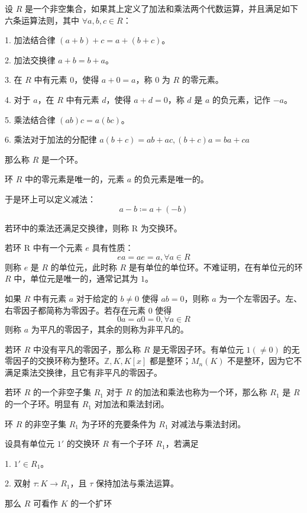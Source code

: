 \begin{definition}[环]
	设 $R$ 是一个非空集合，如果其上定义了加法和乘法两个代数运算，并且满足如下六条运算法则，其中 $\forall a,b,c\in R$：
	
	1. 加法结合律 $(a+b)+c = a+(b+c)$。
	
	2. 加法交换律 $a+b = b+a$。
	
	3. 在 $R$ 中有元素 $0$，使得 $a+0=a$，称 $0$ 为 $R$ 的零元素。
	
	4. 对于 $a$，在 $R$ 中有元素 $d$，使得 $a+d=0$，称 $d$ 是 $a$ 的负元素，记作 $-a$。
	
	5. 乘法结合律 $(ab)c = a(bc)$。
	
	6. 乘法对于加法的分配律 $a(b+c) = ab+ac,(b+c)a = ba+ca$
	
	那么称 $R$ 是一个环。
\end{definition}

\begin{theorem}
	环 $R$ 中的零元素是唯一的，元素 $a$ 的负元素是唯一的。
\end{theorem}

于是环上可以定义减法：
\[a-b \coloneqq  a + (-b)\]

若环中的乘法还满足交换律，则称 R 为交换环。

若环 R 中有一个元素 $e$ 具有性质：
\[ea = ae  = a, \forall a \in R\]
则称 $e$ 是 $R$ 的单位元，此时称 $R$ 是有单位的单位环。不难证明，在有单位元的环 $R$ 中，单位元是唯一的，通常记其为 $1$。

如果 $R$ 中有元素 $a$ 对于给定的 $b \ne 0$ 使得 $ab=0$，则称 $a$ 为一个左零因子。左、右零因子都简称为零因子。若存在元素 $0$ 使得
\[0a=a0=0, \forall a \in R\]
则称 $a$ 为平凡的零因子，其余的则称为非平凡的。

若环 $R$ 中没有平凡的零因子，那么称 $R$ 是无零因子环。有单位元 $1(\ne 0)$ 的无零因子的交换环称为整环。$\mathbb{Z},K,K[x]$ 都是整环；$M_n(K)$ 不是整环，因为它不满足乘法交换律，且它有非平凡的零因子。

若环 $R$ 的一个非空子集 $R_1$ 对于 $R$ 的加法和乘法也称为一个环，那么称 $R_1$ 是 $R$ 的一个子环。明显有 $R_1$ 对加法和乘法封闭。

\begin{theorem}
	环 $R$ 的非空子集 $R_1$ 为子环的充要条件为 $R_1$ 对减法与乘法封闭。
\end{theorem}

\begin{definition}
	设具有单位元 $1'$ 的交换环 $R$ 有一个子环 $R_1$，若满足
	
	1. $1' \in R_1$。
	
	2. 双射 $\tau : K \to R_1$，且 $\tau$ 保持加法与乘法运算。
	
	那么 $R$ 可看作 $K$ 的一个扩环
\end{definition}

